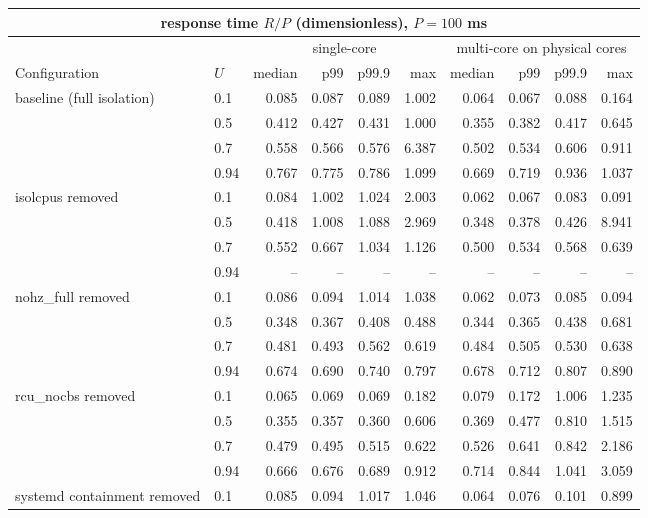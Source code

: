 \begin{tabular}{l|l|rrrr|rrrr}
\toprule
\multicolumn{10}{c}{response time $R/P$ (dimensionless), $P = 100$ ms} \\
\midrule
 &  & \multicolumn{4}{c}{single-core} & \multicolumn{4}{c}{multi-core on physical cores} \\
Configuration & $U$ & median & p99 & p99.9 & max & median & p99 & p99.9 & max \\
\midrule
\multirow[t]{4}{*}{baseline (full isolation)} & 0.1 & 0.085 & 0.087 & 0.089 & 1.002 & 0.064 & 0.067 & 0.088 & 0.164 \\
 & 0.5 & 0.412 & 0.427 & 0.431 & 1.000 & 0.355 & 0.382 & 0.417 & 0.645 \\
 & 0.7 & 0.558 & 0.566 & 0.576 & 6.387 & 0.502 & 0.534 & 0.606 & 0.911 \\
 & 0.94 & 0.767 & 0.775 & 0.786 & 1.099 & 0.669 & 0.719 & 0.936 & 1.037 \\
\cmidrule{1-10}
\multirow[t]{4}{*}{isolcpus removed} & 0.1 & 0.084 & 1.002 & 1.024 & 2.003 & 0.062 & 0.067 & 0.083 & 0.091 \\
 & 0.5 & 0.418 & 1.008 & 1.088 & 2.969 & 0.348 & 0.378 & 0.426 & 8.941 \\
 & 0.7 & 0.552 & 0.667 & 1.034 & 1.126 & 0.500 & 0.534 & 0.568 & 0.639 \\
 & 0.94 & -- & -- & -- & -- & -- & -- & -- & -- \\
\cmidrule{1-10}
\multirow[t]{4}{*}{nohz_full removed} & 0.1 & 0.086 & 0.094 & 1.014 & 1.038 & 0.062 & 0.073 & 0.085 & 0.094 \\
 & 0.5 & 0.348 & 0.367 & 0.408 & 0.488 & 0.344 & 0.365 & 0.438 & 0.681 \\
 & 0.7 & 0.481 & 0.493 & 0.562 & 0.619 & 0.484 & 0.505 & 0.530 & 0.638 \\
 & 0.94 & 0.674 & 0.690 & 0.740 & 0.797 & 0.678 & 0.712 & 0.807 & 0.890 \\
\cmidrule{1-10}
\multirow[t]{4}{*}{rcu_nocbs removed} & 0.1 & 0.065 & 0.069 & 0.069 & 0.182 & 0.079 & 0.172 & 1.006 & 1.235 \\
 & 0.5 & 0.355 & 0.357 & 0.360 & 0.606 & 0.369 & 0.477 & 0.810 & 1.515 \\
 & 0.7 & 0.479 & 0.495 & 0.515 & 0.622 & 0.526 & 0.641 & 0.842 & 2.186 \\
 & 0.94 & 0.666 & 0.676 & 0.689 & 0.912 & 0.714 & 0.844 & 1.041 & 3.059 \\
\cmidrule{1-10}
\multirow[t]{4}{*}{systemd containment removed} & 0.1 & 0.085 & 0.094 & 1.017 & 1.046 & 0.064 & 0.076 & 0.101 & 0.899 \\

\end{tabular}
